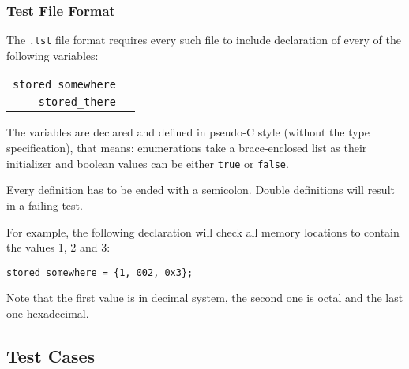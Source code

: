             \subsubsection{Test File Format}

            The \texttt{.tst} file format requires every such file to include declaration of every of the following variables:

            \begin{center}
            \begin{tabular}{ r | l }
                \texttt{stored\_somewhere} & \todo{...}\\

                \texttt{stored\_there} & \todo{...}\\

            \end{tabular}
            \end{center}

            The variables are declared and defined in pseudo-C style (without the type specification), that means: enumerations take a brace-enclosed list as their initializer and boolean values can be either \texttt{true} or \texttt{false}.

            Every definition has to be ended with a semicolon. Double definitions will result in a failing test.

            For example, the following declaration will check all memory locations to contain the values 1, 2 and 3:

            \begin{center}
                \texttt{stored\_somewhere = \{1, 002, 0x3\};}
            \end{center}

            Note that the first value is in decimal system, the second one is octal and the last one hexadecimal.

        \subsection{Test Cases}

